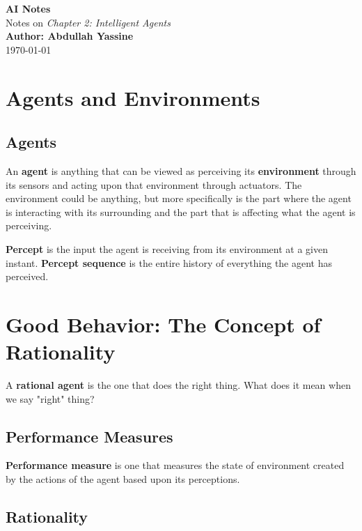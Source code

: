 \documentclass[12pt,a4paper]{article}
\begin{document}
\begin{center}
    {\LARGE \textbf{AI Notes}} \\
    \vspace{0.5em}
    {\large Notes on \textit{Chapter 2: Intelligent Agents}} \\
    \vspace{0.5em}
    \textbf{Author: Abdullah Yassine} \\
    \today
\end{center}

\tableofcontents
\newpage

\section{Agents and Environments}
\subsection{Agents}

An \textbf{agent} is anything that can be viewed as perceiving its \textbf{environment} through its sensors and acting upon that environment through actuators. The environment could be anything, but more specifically is the part where the agent is interacting with its surrounding and the part that is affecting what the agent is perceiving.

\textbf{Percept} is the input the agent is receiving from its environment at a given instant. \textbf{Percept sequence} is the entire history of everything the agent has perceived.

\section{Good Behavior: The Concept of Rationality}

A \textbf{rational agent} is the one that does the right thing. What does it mean when we say "right" thing?

\subsection{Performance Measures}

\textbf{Performance measure} is one that measures the state of environment created by the actions of the agent based upon its perceptions.

\subsection{Rationality}
\end{document}
